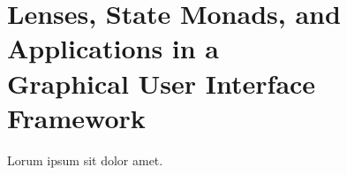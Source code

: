 \section[Lenses, State Monads, and Applications in a Graphical User Interface Framework]{Lenses, State Monads, and Applications in a \\Graphical User Interface Framework}
\label{sec:gui}


Lorum ipsum sit dolor amet.  \lipsum[2-4]